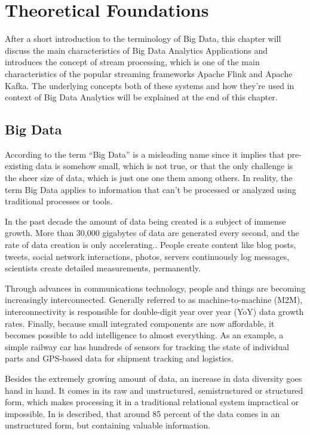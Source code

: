 \chapter{Theoretical Foundations}

After a short introduction to the terminology of Big Data, this chapter will discuss the main
characteristics of Big Data Analytics Applications and introduces the concept of stream processing,
which is one of the main characteristics of the popular streaming frameworks Apache Flink and
Apache Kafka. The underlying concepts both of these systems and how they're used in context of
Big Data Analytics will be explained at the end of this chapter.

\section{Big Data}

According to \cite{Marz15} the term “Big Data” is a misleading name since it implies that pre-existing
data is somehow small, which is not true, or that the only challenge is the sheer size of data, which
is just one one them among others. In reality, the term Big Data applies to information that can’t be
processed or analyzed using traditional processes or tools.

In the past decade the amount of data being created is a subject of immense growth. More than
30,000 gigabytes of data are generated every second, and the rate of data creation is only
accelerating.\cite{Marz15}. People create content like blog posts, tweets, social network interactions,
photos, servers continuously log messages, scientists create detailed measurements, permanently.

Through advances in communications technology, people and things are becoming increasingly interconnected.
Generally referred to as machine-to-machine (M2M), interconnectivity is responsible for double-digit year
over year (YoY) data growth rates. Finally, because small integrated components are now affordable, it
becomes possible to add intelligence to almost everything. As an example, a simple railway car has
hundreds of sensors for tracking the state of individual parts and GPS-based data for shipment tracking
and logistics.\cite{Ziko12}

Besides the extremely growing amount of data, an increase in data diversity goes hand in hand.
It comes in its raw and unstructured, semistructured or structured form, which makes processing it in a
traditional relational system impractical or impossible. In \cite{Bitk12} is described, that around
85 percent of the data comes in an unstructured form, but containing valuable information.

